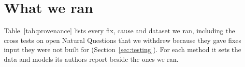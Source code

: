 \section{What we ran}
\label{app:provenance}

Table~\ref{tab:provenance} lists every fix, cause and dataset we ran,
including the cross tests on open Natural Questions that we withdrew because
they gave fixes input they were not built for (Section~\ref{sec:testing}). For each method it sets the data and models its authors report
beside the ones we ran.

